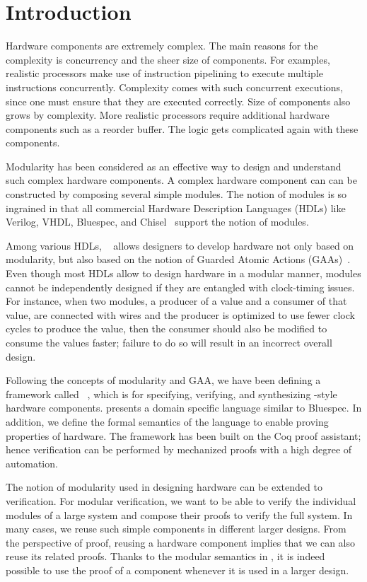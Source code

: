 \chapter{Introduction}

Hardware components are extremely complex. The main reasons for the
complexity is concurrency and the sheer size of components. For
examples, realistic processors make use of instruction pipelining to
execute multiple instructions concurrently. Complexity comes with such
concurrent executions, since one must ensure that they are executed
correctly. Size of components also grows by complexity. More realistic
processors require additional hardware components such as a reorder
buffer. The logic gets complicated again with these components.

Modularity has been considered as an effective way to design and
understand such complex hardware components. A complex hardware
component can can be constructed by composing several simple
modules. The notion of modules is so ingrained in that all commercial
Hardware Description Languages (HDLs) like Verilog, VHDL, Bluespec,
and Chisel~\cite{verilog, vhdl, bsdef, chisel} support the notion of
modules.

Among various HDLs, \Bluespec{}~\cite{bsdef, bsref} allows designers
to develop hardware not only based on modularity, but also based on
the notion of Guarded Atomic Actions (GAAs)~\cite{daniel-gaa}. Even
though most HDLs allow to design hardware in a modular manner, modules
cannot be independently designed if they are entangled with
clock-timing issues. For instance, when two modules, a producer of a
value and a consumer of that value, are connected with wires and the
producer is optimized to use fewer clock cycles to produce the value,
then the consumer should also be modified to consume the values
faster; failure to do so will result in an incorrect overall design.

Following the concepts of modularity and GAA, we have been defining a
framework called \Kami{}~\cite{kami-web, murali-thesis}, which is for
specifying, verifying, and synthesizing \Bluespec{}-style hardware
components. \Kami{} presents a domain specific language similar to
Bluespec. In addition, we define the formal semantics of the \Kami{}
language to enable proving properties of hardware. The framework has
been built on the Coq proof assistant; hence verification can be
performed by mechanized proofs with a high degree of automation.

The notion of modularity used in designing hardware can be extended to
verification. For modular verification, we want to be able to verify
the individual modules of a large system and compose their proofs to
verify the full system. In many cases, we reuse such simple components
in different larger designs. From the perspective of proof, reusing a
hardware component implies that we can also reuse its related
proofs. Thanks to the modular semantics in \Kami{}, it is indeed
possible to use the proof of a component whenever it is used in a
larger design.

